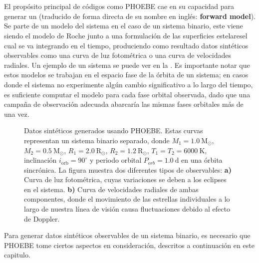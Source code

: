 \section{}

El propósito principal de códigos como PHOEBE cae en su capacidad para generar
un  (traducido de forma directa de su nombre
en inglés: \textbf{forward model}). Se parte de un modelo del sistema\textemdash
en el caso de un sistema binario, este viene siendo el modelo de Roche junto a
una formulación de las superficies estelares\textemdash el cual se va integrando
en el tiempo, produciendo como resultado datos sintéticos observables como una
curva de luz fotométrica o una curva de velocidades radiales. Un ejemplo de un
sistema  se puede ver en la
. Es importante notar que estos
modelos se trabajan en el espacio fase de la órbita de un sistema; en casos
donde el sistema no experimente algún cambio significativo a lo largo del
tiempo, es suficiente computar el modelo para cada fase orbital observada, dado
que una campaña de observación adecuada abarcaría las mismas fases orbitales más
de una vez.

\begin{figure}[!ht]
	\centering
	\caption{Datos sintéticos generados usando PHOEBE. Estas curvas representan
	un sistema binario separado, donde $M_1 = 1.0 \ \mathrm{M}_{\odot}$, $M_2 =
	0.5 \ \mathrm{M}_{\odot}$, $R_1 = 2.0 \ \mathrm{R}_{\odot}$, $R_2 = 1.2 \
	\mathrm{R}_{\odot}$, $T_1 = T_2 = 6000 \ \mathrm{K}$, inclinación
	$i_{\mathrm{orb}} = 90^{\circ}$ y periodo orbital $P_{orb} = 1.0 \
	\mathrm{d}$ en una órbita sincrónica. La figura muestra dos diferentes tipos
	de observables: \textbf{a)} Curva de luz fotométrica, cuyas variaciones se
	deben a los eclipses en el sistema. \textbf{b)} Curva de velocidades
	radiales de ambas componentes, donde el movimiento de las estrellas
	individuales a lo largo de nuestra línea de visión causa fluctuaciones
	debido al efecto de Doppler.} 
	\label{figuraPhoebeObservablesSinteticos}
\end{figure}

Para generar datos sintéticos observables de un sistema binario, es necesario
que PHOEBE tome ciertos aspectos en consideración, descritos a continuación en
este capitulo.

